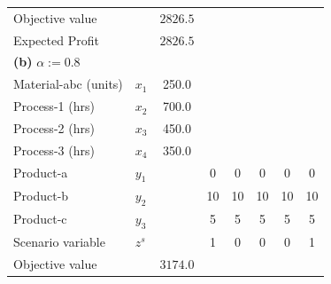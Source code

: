 \documentclass[7pt]{article}
\begin{document}
\begin{table}[h!]
\begin{tabular}{ll|c|ccccc}
        Objective value       &                                            & $2826.5$        &                                                                                     \\
        Expected Profit       &                                            & $2826.5$        &                                                                                     \\
        \midrule
        \multicolumn{8}{l}{\textbf{(b)} $\alpha := 0.8$}                                                                                                                           \\
        \midrule
        Material-abc (units)  & $x_1$                                      & 250.0           &              &                   &               &                                  \\
        Process-1 (hrs)       & $x_2$                                      & 700.0           &              &                   &               &                                  \\
        Process-2 (hrs)       & $x_3$                                      & 450.0           &              &                   &               &                                  \\
        Process-3 (hrs)       & $x_4$                                      & 350.0           &              &                   &               &                                  \\
        Product-a             & $y_1$                                      &                 & 0            & 0                 & 0             & 0                & 0             \\
        Product-b             & $y_2$                                      &                 & 10           & 10                & 10            & 10               & 10            \\
        Product-c             & $y_3$                                      &                 & 5            & 5                 & 5             & 5                & 5             \\
        Scenario variable     & $z^s$                                      &                 & 1            & 0                 & 0             & 0                & 1             \\
        Objective value       &                                            & $3174.0$        &                                                                                     \\

\end{tabular}
\end{table}
\end{document}
